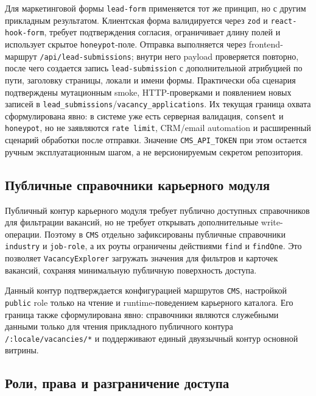 Для маркетинговой формы \texttt{lead-form} применяется тот же принцип, но с другим
прикладным результатом. Клиентская форма валидируется через \texttt{zod} и
\texttt{react-hook-form}, требует подтверждения согласия, ограничивает длину полей и
использует скрытое \texttt{honeypot}-поле. Отправка выполняется через frontend-маршрут
\texttt{/api/lead-submissions}; внутри него payload проверяется повторно, после чего
создается запись \texttt{lead-submission} с дополнительной атрибуцией по пути,
заголовку страницы, локали и имени формы. Практически оба сценария подтверждены
мутационным smoke, HTTP-проверками и появлением новых записей в
\texttt{lead\_submissions}/\texttt{vacancy\_applications}. Их текущая граница охвата
сформулирована явно: в системе уже есть серверная валидация, \texttt{consent} и
\texttt{honeypot}, но не заявляются \texttt{rate limit}, CRM/email automation и
расширенный сценарий обработки после отправки. Значение \texttt{CMS\_API\_TOKEN} при этом остается
ручным эксплуатационным шагом, а не версионируемым секретом репозитория.

\subsection{Публичные справочники карьерного модуля}

Публичный контур карьерного модуля требует публично доступных справочников для фильтрации
вакансий, но не требует открывать дополнительные write-операции. Поэтому в \texttt{CMS}
отдельно зафиксированы публичные справочники \texttt{industry} и \texttt{job-role}, а их
роуты ограничены действиями \texttt{find} и \texttt{findOne}. Это позволяет
\texttt{VacancyExplorer} загружать значения для фильтров и карточек вакансий, сохраняя
минимальную публичную поверхность доступа.

Данный контур подтверждается конфигурацией маршрутов \texttt{CMS}, настройкой
\texttt{public} role только на чтение и runtime-поведением карьерного каталога. Его граница также
сформулирована явно: справочники являются служебными данными только для чтения прикладного
публичного контура \texttt{/:locale/vacancies/*} и поддерживают единый двуязычный
контур основной витрины.

\subsection{Роли, права и разграничение доступа}

